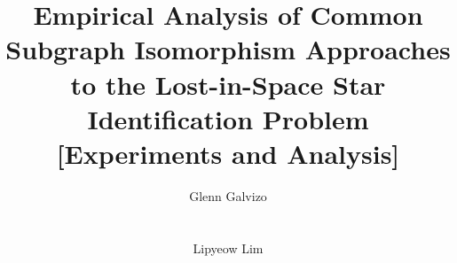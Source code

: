 \documentclass{include/vldb}
\begin{document}
	\title{Empirical Analysis of Common Subgraph Isomorphism Approaches to the Lost-in-Space Star
    Identification Problem [Experiments and Analysis]}

	\author{
		\alignauthor Glenn Galvizo  \\
			 \\
			 \\
		\alignauthor Lipyeow Lim \\
			 \\
			 \\
	}

	\maketitle

	
	
	
	
	
	
	\newpage 
    
    \balance

	
	
\end{document}
